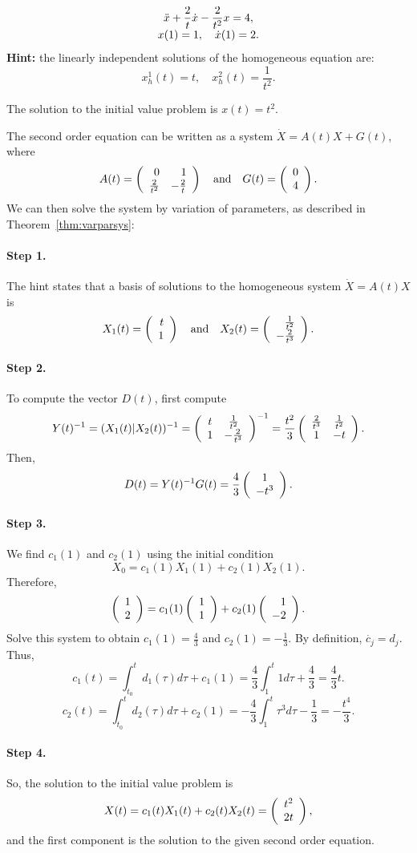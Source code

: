 \documentclass{ximera}
\begin{document}
\begin{exercise}  \label{c14.3.2b}
\[
\begin{array}{c}
\displaystyle \ddot x + \frac{2}{t} \dot x - \frac{2}{t^2} x = 4,\\
\displaystyle x(1) = 1,\quad \dot x(1) = 2.
\end{array}
\]
{\bf Hint:} the linearly independent solutions of the homogeneous 
equation are:
\[
x^1_h(t) = t,\quad x^2_h(t)=\frac{1}{t^2}.
\]

\begin{solution}
\ans The solution to the initial value problem is
$x(t) = t^2$.

\soln The second order equation can be written as a system
$\dot{X} = A(t)X + G(t)$, where
\[
A(t) = \left(\begin{array}{rr} 0 & 1\\ \frac{2}{t^2} &-\frac{2}{t}\end{array}\right) \quad\mbox{and}\quad G(t) = \left(\begin{array}{c} 0 \\ 4\end{array}\right).
\]
We can then solve the system by variation of parameters, as described in
Theorem~\ref{thm:varparsys}:

\paragraph{Step 1.} The hint states that
a basis of solutions to the homogeneous system
$\dot{X} = A(t)X$ is
\[
X_1(t) = \left(\begin{array}{r} t \\ 1\end{array}\right) \quad\mbox{and}\quad X_2(t) = \left(\begin{array}{r} \frac{1}{t^2} \\ -\frac{2}{t^3}\end{array}\right).
\]
\paragraph{Step 2.} To compute the vector $D(t)$, first compute
\[
Y(t)^{-1} = (X_1(t)|X_2(t))^{-1} =
\left(\begin{array}{cc} t & \frac{1}{t^2}\\ 1 &-\frac{2}{t^3}\end{array}\right)^{-1} =
\frac{t^2}{3}\left(\begin{array}{cc} \frac{2}{t^3} & \frac{1}{t^2}\\ 1 &-t\end{array}\right).
\]
Then,
\[
D(t) = Y(t)^{-1}G(t) = \frac{4}{3}\left(\begin{array}{c} 1 \\ -t^3\end{array}\right).
\]
\paragraph{Step 3.} We find $c_1(1)$ and $c_2(1)$ using the initial
condition
\[
X_0 = c_1(1)X_1(1) + c_2(1)X_2(1).
\]
Therefore,
\[
\left(\begin{array}{r} 1 \\ 2\end{array}\right) = c_1(1)\left(\begin{array}{r} 1 \\ 1\end{array}\right) + c_2(1)\left(\begin{array}{r} 1 \\ -2\end{array}\right).
\]
Solve this system to obtain $c_1(1) = \frac{4}{3}$ and $c_2(1) = -\frac{1}{3}$.
By definition,
$\dot{c_j} = d_j$.  Thus,
\[
c_1(t) = \int_{t_0}^td_1(\tau)d\tau + c_1(1)
= \frac{4}{3}\int_{1}^t 1 d\tau + \frac{4}{3} = \frac{4}{3}t.
\]
\[
c_2(t) = \int_{t_0}^td_2(\tau)d\tau + c_2(1)
= -\frac{4}{3}\int_{1}^t\tau^3 d\tau - \frac{1}{3}= -\frac{t^4}{3}.
\]
\paragraph{Step 4.} So, the solution to the initial value problem is
\[
X(t) = c_1(t)X_1(t) + c_2(t)X_2(t) = \left(\begin{array}{c} t^2 \\ 2t\end{array}\right),
\]
and the first component is the solution to the given second order
equation.

\end{solution}
\end{exercise}
\end{document}
